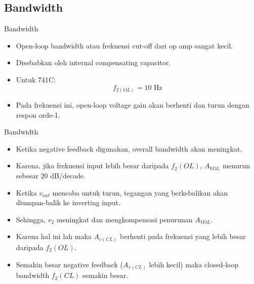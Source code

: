 \subsection{Bandwidth}

\begin{frame}[t]{Bandwidth}
	\begin{itemize}
		\item Open-loop bandwidth atau frekuensi cut-off dari op amp sangat kecil.
		\item Disebabkan oleh internal compensating capacitor.
		\item Untuk 741C: $$ f_{2(OL)} = 10 \text{ Hz} $$
		\item Pada frekuensi ini, open-loop voltage gain akan berhenti dan turun dengan respon orde-1.
	\end{itemize}
\end{frame}

\begin{frame}[t]{Bandwidth}
	\begin{itemize}
		\item Ketika negative feedback digunakan, overall bandwidth akan meningkat.
		\item Karena, jika frekuensi input lebih besar daripada $ f_2(OL) $, $ A_{VOL} $ menurun sebesar 20 dB/decade.
		\item Ketika $ v_{out} $ mencoba untuk turun, tegangan yang berkebalikan akan diumpan-balik ke inverting input.
		\item Sehingga, $ v_2 $ meningkat dan mengkompensasi penurunan $ A_{VOL} $.
		\item Karena hal ini lah maka $ A_{v(CL)} $ berhenti pada frekuensi yang lebih besar daripada $ f_2(OL) $.
		\item Semakin besar negative feedback ($ A_{v(CL)} $ lebih kecil) maka closed-loop bandwidth $ f_2(CL) $ semakin besar.
	\end{itemize}
\end{frame}


